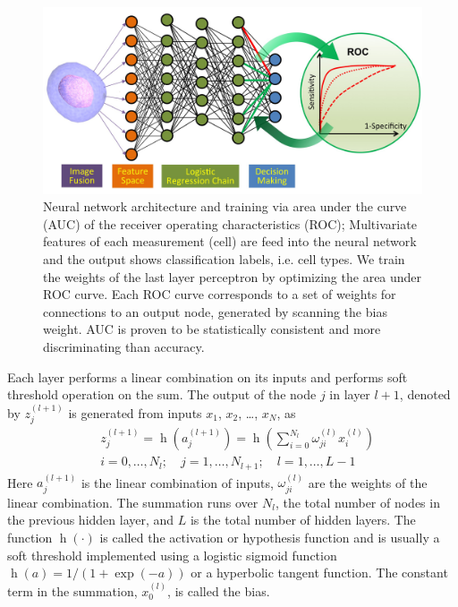 \documentclass[aps,pra,reprint,superscriptaddress]{revtex4-1}
\DeclareMathOperator{\h}{h} %
\begin{document}
\begin{figure}
\includegraphics[scale=0.2]{FigureNeuralNet.jpg}
\caption{\label{fig:NeuralNet} Neural network architecture and training via area under the curve (AUC) of the receiver operating characteristics (ROC); Multivariate features of each measurement (cell) are feed into the neural network and the output shows classification labels, i.e. cell types. We train the weights of the last layer perceptron by optimizing the area under ROC curve. Each ROC curve corresponds to a set of weights for connections to an output node, generated by scanning the bias weight. AUC is proven to be statistically consistent and more discriminating than accuracy.}
\end{figure}

Each layer performs a linear combination on its inputs and performs soft threshold operation on the sum. The output of the node $j$ in layer $l+1$, denoted by $z_j^{(l+1)}$ is generated from inputs $x_1$, $x_2$, \ldots, $x_N$, as
\begin{equation}
\begin{split}
& z_j^{(l+1)} = \h(a_j^{(l+1)}) = \h(\sum_{i=0}^{N_l} \omega_{ji}^{(l)} x_i^{(l)})\\
& i =0,\dotsc,N_l;\quad j=1,\dotsc,N_{l+1};\quad l=1,\dotsc,L-1
\end{split}
\end{equation}
Here $a_j^{(l+1)}$ is the linear combination of inputs, $\omega_{ji}^{(l)}$ are the weights of the linear combination. The summation runs over $N_l$, the total number of nodes in the previous hidden layer, and $L$ is the total number of hidden layers. The function $\h(\cdot)$ is called the activation or hypothesis function and is usually a soft threshold implemented using a logistic sigmoid function $\h(a)=1/(1+\exp(-a))$ or a hyperbolic tangent function. The constant term in the summation, $x_0^{(l)}$, is called the bias.
\end{document}

